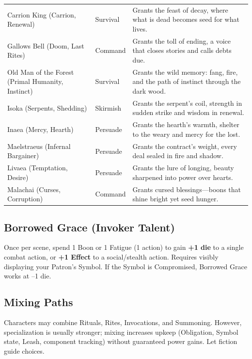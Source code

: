 \begin{longtable}{@{}p{3.8cm}p{3.8cm}p{7.5cm}@{}}
Carrion King (Carrion, Renewal) & Survival & Grants the feast of decay, where what is dead becomes seed for what lives. \\
Gallows Bell (Doom, Last Rites) & Command & Grants the toll of ending, a voice that closes stories and calls debts due. \\
Old Man of the Forest (Primal Humanity, Instinct) & Survival & Grants the wild memory: fang, fire, and the path of instinct through the dark wood. \\
Isoka (Serpents, Shedding) & Skirmish & Grants the serpent's coil, strength in sudden strike and wisdom in renewal. \\
Inaea (Mercy, Hearth) & Persuade & Grants the hearth's warmth, shelter to the weary and mercy for the lost. \\
Maelstraeus (Infernal Bargainer) & Persuade & Grants the contract's weight, every deal sealed in fire and shadow. \\
Livaea (Temptation, Desire) & Persuade & Grants the lure of longing, beauty sharpened into power over hearts. \\
Malachai (Curses, Corruption) & Command & Grants cursed blessings---boons that shine bright yet seed hunger. \\
\bottomrule
\end{longtable}

\subsection{Borrowed Grace (Invoker Talent)}
\label{talent:borrowed-grace}

Once per scene, spend 1 Boon or 1 Fatigue (1 action) to gain \textbf{+1 die} to a single combat action, or \textbf{+1 Effect} to a social/stealth action. Requires visibly displaying your Patron's Symbol. If the Symbol is Compromised, Borrowed Grace works at --1 die.

\subsection{Mixing Paths}
Characters may combine Rituals, Rites, Invocations, and Summoning. However, specialization is usually stronger; mixing increases upkeep (Obligation, Symbol state, Leash, component tracking) without guaranteed power gains. Let fiction guide choices.